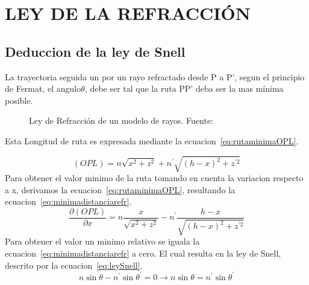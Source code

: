 \documentclass[letterpaper, 10 pt, conference]{ieeeconf}  %
\begin{document}
\section{LEY DE LA REFRACCI\'ON}

\subsection{Deduccion de la ley de Snell}
La trayectoria seguida un por un rayo refractado desde P a P', segun el principio de Fermat, el angulo\(\theta\), debe ser tal que la ruta PP' deba ser la mas m\'inima posible.
\begin{figure}[ht!]
\caption{Ley de Refracci\'on de un modelo de rayos. Fuente:~\cite{1}
}\label{fig:PrincipioRefraccion}
\end{figure}
Esta Longitud de ruta es expresada mediante la ecuacion~\eqref{eq:rutaminimaOPL}. 

\begin{equation}
\label{eq:rutaminimaOPL}
{
(OPL) = n\sqrt {{x^2} + {z^2}}  + {n^'}\sqrt {{{(h - x)}^2} + {z^{'2}}}
}
\end{equation}
Para obtener el valor minimo de la ruta tomando en cuenta la variacion respecto a x, derivamos la ecuacion~\eqref{eq:rutaminimaOPL}, resultando la ecuacion~\eqref{eq:minimadistanciarefr}.
\begin{equation}
\label{eq:minimadistanciarefr}
{
\frac{{\partial (OPL)}}{{\partial x}} = n\frac{x}{{\sqrt {{x^2} + {z^2}} }} - {n^'}\frac{{h - x}}{{\sqrt {{{(h - x)}^2} + {z^{'2}}} }}
}
\end{equation}
Para obtener el valor un minimo relativo se iguala la ecuacion~\eqref{eq:minimadistanciarefr} a cero. El cual resulta en la ley de Snell, descrito por la ecuacion~\eqref{eq:leySnell}.
\begin{equation}
\label{eq:leySnell}
{
n\sin \theta  - {n^'}\sin {\theta ^'} = 0 \to n\sin \theta  = {n^'}\sin {\theta ^'}
}
\end{equation}
\end{document}
